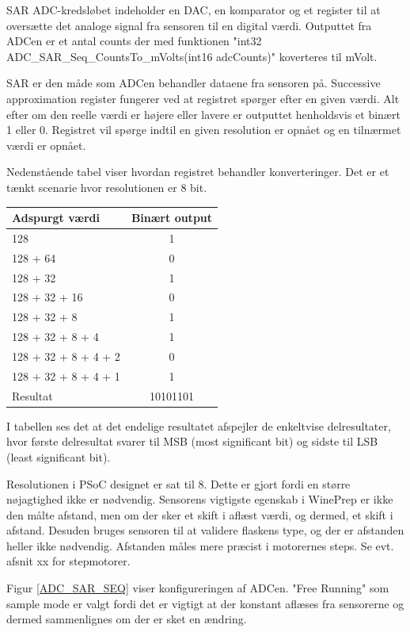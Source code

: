 SAR ADC-kredsløbet indeholder en DAC, en komparator og et register til at oversætte det analoge signal fra sensoren til en digital værdi. Outputtet fra ADCen er et antal counts der med funktionen "int32 ADC{\_}SAR{\_}Seq{\_}CountsTo{\_}mVolts(int16 adcCounts)" koverteres til mVolt.

SAR er den måde som ADCen behandler dataene fra sensoren på. Successive approximation register fungerer ved at registret spørger efter en given værdi. Alt efter om den reelle værdi er højere eller lavere er outputtet henholdsvis et binært 1 eller 0. Registret vil spørge indtil en given resolution er opnået og en tilnærmet værdi er opnået.

Nedenstående tabel viser hvordan registret behandler konverteringer. Det er et tænkt scenarie hvor resolutionen er 8 bit.

\begin{table}
\begin{tabular}{| l | c |}
Adspurgt værdi & Binært output\\\hline
128 & 1\\\hline
128 + 64 & 0\\\hline
128 + 32 & 1\\\hline
128 + 32 + 16 & 0\\\hline
128 + 32 + 8 & 1\\\hline
128 + 32 + 8 + 4 & 1\\\hline
128 + 32 + 8 + 4 + 2 & 0\\\hline
128 + 32 + 8 + 4 + 1 & 1\\\hline
Resultat & 10101101\\\hline
\end{tabular}
\end{table}

I tabellen ses det at det endelige resultatet afspejler de enkeltvise delresultater, hvor første delresultat svarer til MSB (most significant bit) og sidste til LSB (least significant bit).

Resolutionen i PSoC designet er sat til 8. Dette er gjort fordi en større nøjagtighed ikke er nødvendig. Sensorens vigtigste egenskab i WinePrep er ikke den målte afstand, men om der sker et skift i aflæst værdi, og dermed, et skift i afstand. Desuden bruges sensoren til at validere flaskens type, og der er afstanden heller ikke nødvendig. Afstanden måles mere præcist i motorernes steps. Se evt. afsnit xx for stepmotorer.

Figur \ref{ADC_SAR_SEQ} viser konfigureringen af ADCen. "Free Running" som sample mode er valgt fordi det er vigtigt at der konstant aflæses fra sensorerne og dermed sammenlignes om der er sket en ændring.

